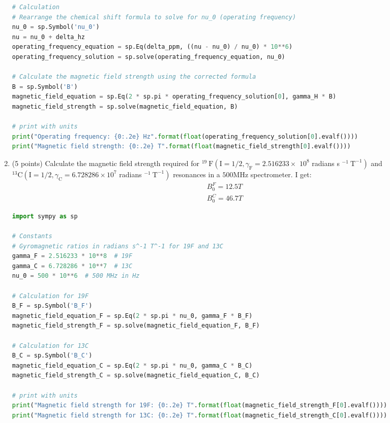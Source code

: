 \documentclass[12pt]{article}
\begin{document}
\begin{enumerate}
\begin{lstlisting}[language=Python]
# Calculation
# Rearrange the chemical shift formula to solve for nu_0 (operating frequency)
nu_0 = sp.Symbol('nu_0')
nu = nu_0 + delta_hz
operating_frequency_equation = sp.Eq(delta_ppm, ((nu - nu_0) / nu_0) * 10**6)
operating_frequency_solution = sp.solve(operating_frequency_equation, nu_0)

# Calculate the magnetic field strength using the corrected formula
B = sp.Symbol('B')
magnetic_field_equation = sp.Eq(2 * sp.pi * operating_frequency_solution[0], gamma_H * B)
magnetic_field_strength = sp.solve(magnetic_field_equation, B)

# print with units
print("Operating frequency: {0:.2e} Hz".format(float(operating_frequency_solution[0].evalf())))
print("Magnetic field strength: {0:.2e} T".format(float(magnetic_field_strength[0].evalf())))

\end{lstlisting}
  \item (5 points) Calculate the magnetic field strength required for ${ }^{19} \mathrm{~F}\left(\mathrm{I}=1 / 2, \gamma_{\mathrm{F}}=2.516233 \times\right.$ $10^{8}$ radians s $\left.^{-1} \mathrm{~T}^{-1}\right)$ and ${ }^{13} \mathrm{C}\left(\mathrm{I}=1 / 2, \gamma_{\mathrm{C}}=6.728286 \times 10^{7}\right.$ radians $\left.^{-1} \mathrm{~T}^{-1}\right)$ resonances in a $500 \mathrm{MHz}$ spectrometer.
  I get:
\begin{align}
  B_{0}^{F} = 12.5 T\\
  B_{0}^{C} = 46.7 T
\end{align}
\begin{lstlisting}[language=Python]
import sympy as sp

# Constants
# Gyromagnetic ratios in radians s^-1 T^-1 for 19F and 13C
gamma_F = 2.516233 * 10**8  # 19F
gamma_C = 6.728286 * 10**7  # 13C
nu_0 = 500 * 10**6  # 500 MHz in Hz

# Calculation for 19F
B_F = sp.Symbol('B_F')
magnetic_field_equation_F = sp.Eq(2 * sp.pi * nu_0, gamma_F * B_F)
magnetic_field_strength_F = sp.solve(magnetic_field_equation_F, B_F)

# Calculation for 13C
B_C = sp.Symbol('B_C')
magnetic_field_equation_C = sp.Eq(2 * sp.pi * nu_0, gamma_C * B_C)
magnetic_field_strength_C = sp.solve(magnetic_field_equation_C, B_C)

# print with units
print("Magnetic field strength for 19F: {0:.2e} T".format(float(magnetic_field_strength_F[0].evalf())))
print("Magnetic field strength for 13C: {0:.2e} T".format(float(magnetic_field_strength_C[0].evalf())))


\end{lstlisting}
\end{enumerate}
\end{document}
